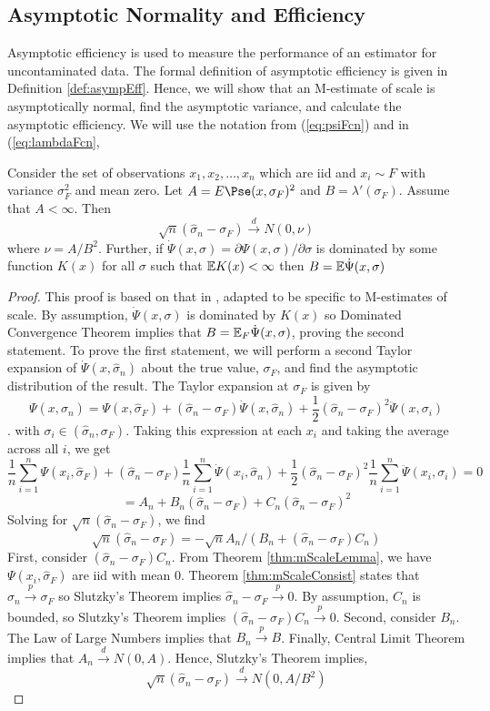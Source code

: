 \subsection{Asymptotic Normality and Efficiency}

Asymptotic efficiency is used to measure the performance of an estimator for uncontaminated data. The formal definition of asymptotic efficiency is given in Definition \ref{def:asympEff}. Hence, we will show that an M-estimate of scale is asymptotically normal, find the asymptotic variance, and calculate the asymptotic efficiency.  We will use the notation from (\ref{eq:psiFcn}) and in (\ref{eq:lambdaFcn},
\begin{thm}
\label{thm:mScaleAsympNormaliy}
Consider the set of observations $x_1, x_2,  \hdots, x_n$ which are iid and $x_i \sim F$ with variance $\sigma_F^2$ and mean zero. Let $A = E \Pse(x,\sigma_F)^2$ and $B = \lambda'(\sigma_F)$. Assume that $A < \infty$. Then
$$ \sqrt{n} (\hat\sigma_n - \sigma_F) \xrightarrow{d} N(0,\nu) $$
where $\nu = A/B^2$. Further, if $\Dot{\Psi}(x,\sigma) = \partial \Psi(x,\sigma)/\partial \sigma$ is dominated by some function $K(x)$ for all $\sigma$ such that $\mathbb{E} K(x) < \infty$ then $B = \mathbb{E} \Dot{\Psi}(x,\sigma)$
\end{thm}
\begin{proof}
This proof is based on that in \cite{maronna2019robust}, adapted to be specific to M-estimates of scale. By assumption, $\Dot{\Psi}(x,\sigma)$ is dominated by $K(x)$ so Dominated Convergence Theorem implies that $B = \mathbb{E}_F \Dot{\Psi}(x,\sigma)$, proving the second statement. To prove the first statement, we will perform a second Taylor expansion of $\Dot{\Psi}(x,\hat\sigma_n)$ about the true value, $\sigma_F$, and find the asymptotic distribution of the result. The Taylor expansion at $\sigma_F$ is given by
$$ \Psi(x,\hat\sigma_n) = \Psi(x,\hat\sigma_F) + (\hat\sigma_n - \sigma_F) \Dot{\Psi}(x,\hat\sigma_n) + \frac{1}{2} (\hat\sigma_n - \sigma_F)^2 \ddot{\Psi}(x,\sigma_i)$$.
with $\sigma_i \in (\hat\sigma_n, \sigma_F)$. Taking this expression at each $x_i$ and taking the average across all $i$, we get
$$\frac{1}{n} \sum_{i=1}^n \Psi(x_i,\hat\sigma_F) + (\hat\sigma_n - \sigma_F) \frac{1}{n} \sum_{i=1}^n \Dot{\Psi}(x_i,\hat\sigma_n) + \frac{1}{2} (\hat\sigma_n - \sigma_F)^2 \frac{1}{n} \sum_{i=1}^n \ddot{\Psi}(x_i,\sigma_i) = 0 $$
$$= A_n + B_n (\hat\sigma_n - \sigma_F) + C_n (\hat\sigma_n - \sigma_F)^2$$
Solving for $\sqrt{n} (\hat\sigma_n - \sigma_F)$, we find
$$ \sqrt{n} (\hat\sigma_n - \sigma_F) = -\sqrt{n}A_n/(B_n + (\hat\sigma_n - \sigma_F) C_n) $$
First, consider $(\hat\sigma_n - \sigma_F) C_n$. From Theorem \ref{thm:mScaleLemma}, we have $\Psi(x_i,\hat\sigma_F)$ are iid with mean 0. Theorem \ref{thm:mScaleConsist} states that $\hat\sigma_n \xrightarrow{p} \sigma_F$ so Slutzky's Theorem implies $\hat\sigma_n -\sigma_F \xrightarrow{p} 0$. By assumption, $C_n$ is bounded, so Slutzky's Theorem implies $(\hat\sigma_n - \sigma_F) C_n \xrightarrow{p} 0$. Second, consider $B_n$. The Law of Large Numbers implies that $B_n\xrightarrow{p} B$. Finally, Central Limit Theorem implies that $A_n \xrightarrow{d} N(0,A)$. Hence, Slutzky's Theorem implies,
$$ \sqrt{n} (\hat\sigma_n - \sigma_F) \xrightarrow{d} N( 0, A/B^2 ) $$
\end{proof}
